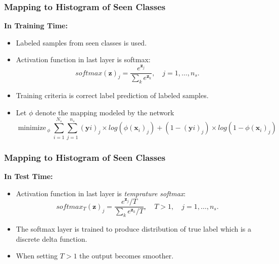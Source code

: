 \documentclass{beamer}
\DeclareMathOperator*{\minimize}{minimize\,}
\begin{document}
\begin{frame}\frametitle{Mapping to Histogram of Seen Classes}
  \textbf{In Training Time:}
  \begin{itemize}
  \item Labeled samples from seen classes is used.
  \item Activation function in last layer is softmax:
    \begin{equation}
\label{softmax}
softmax(\mathbf{z})_j = \frac{e^{\mathbf{z}_j}}{\sum_k e^{\mathbf{z}_k}}, \quad j = 1, \ldots, n_s.
\end{equation}
  \item Training criteria is correct label prediction of labeled samples.
  \item   Let $\phi$ denote the mapping modeled by the network
  \begin{equation}
  \minimize_{\phi} \sum_{i=1}^{N_s} \sum_{j=1}^{n_s} (\mathbf{y}i)_j \times log(\phi(\mathbf{x}_i)_j) + (1- (\mathbf{y}i)_j) \times log(1 - \phi(\mathbf{x}_i)_j)
\end{equation}
\end{itemize}
\end{frame}

\begin{frame}\frametitle{Mapping to Histogram of Seen Classes}
  \textbf{In Test Time:}
\begin{itemize}
  \item Activation function in last layer is \textit{temprature softmax}:
    \begin{equation}
    \label{softmax}
    softmax_T(\mathbf{z})_j = \frac{e^{\mathbf{z}_j}/T}{\sum_k e^{\mathbf{z}_k}/T}, \quad T>1,  \quad j = 1, \ldots, n_s.
    \end{equation}
\item The softmax layer is trained to produce distribution of true label which is a discrete delta function.
\item When setting $T > 1$ the output becomes smoother.
\end{itemize}
\begin{figure}
\hfill
{}
\hfill
{}
\hfill
\end{figure}
\end{frame}
\end{document}
